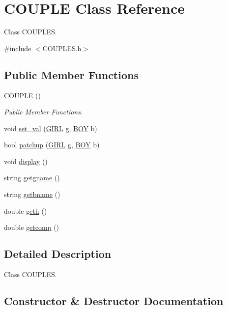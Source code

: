 \hypertarget{class_c_o_u_p_l_e}{}\section{C\+O\+U\+P\+LE Class Reference}
\label{class_c_o_u_p_l_e}


Class C\+O\+U\+P\+L\+ES.  




{\ttfamily \#include $<$C\+O\+U\+P\+L\+E\+S.\+h$>$}

\subsection*{Public Member Functions}
\begin{DoxyCompactItemize}
\item 
\hyperlink{class_c_o_u_p_l_e_a5132690a49cdc49489fa3ea44f8f38ea}{C\+O\+U\+P\+LE} ()
\begin{DoxyCompactList}\small\item\em Public Member Functions. \end{DoxyCompactList}\item 
void \hyperlink{class_c_o_u_p_l_e_acb721e44912b9318da0facbb23c2c66c}{set\+\_\+val} (\hyperlink{class_g_i_r_l}{G\+I\+RL} g, \hyperlink{class_b_o_y}{B\+OY} b)
\item 
bool \hyperlink{class_c_o_u_p_l_e_a98547298545f61138f85af7dd9ac188c}{patchup} (\hyperlink{class_g_i_r_l}{G\+I\+RL} g, \hyperlink{class_b_o_y}{B\+OY} b)
\item 
void \hyperlink{class_c_o_u_p_l_e_ab0ccebe80c96e08fa53e01d766e45c6e}{display} ()
\item 
string \hyperlink{class_c_o_u_p_l_e_a61f4137001b8d4f45036b13e67b0b582}{getgname} ()
\item 
string \hyperlink{class_c_o_u_p_l_e_a9a1fdc2aae018a1572dc94b7530583f1}{getbname} ()
\item 
double \hyperlink{class_c_o_u_p_l_e_a02c5163d45a74f2047bc6e08e3b3faa5}{geth} ()
\item 
double \hyperlink{class_c_o_u_p_l_e_ae20b039a8a7ea8389e32621a422ba2f3}{getcomp} ()
\end{DoxyCompactItemize}


\subsection{Detailed Description}
Class C\+O\+U\+P\+L\+ES. 

\subsection{Constructor \& Destructor Documentation}
\mbox{\label{class_c_o_u_p_l_e_a5132690a49cdc49489fa3ea44f8f38ea}} 
